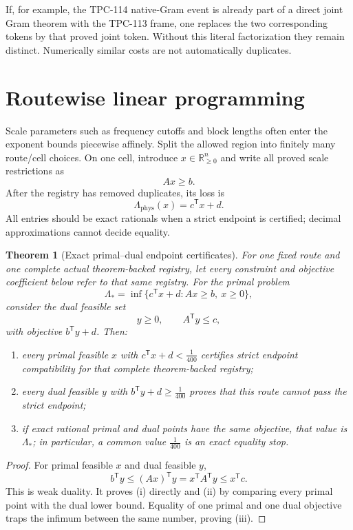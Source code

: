 \documentclass[11pt]{article}
\newtheorem{theorem}{Theorem}[section]
\theoremstyle{definition}
\theoremstyle{remark}
\newcommand{\R}{\mathbb R}
\newcommand{\Lam}{\Lambda_{\mathrm{phys}}}
\newcommand{\epsend}{\frac1{400}}
\begin{document}
If, for example, the TPC-114 native-Gram event is already part of a
direct joint Gram theorem with the TPC-113 frame, one replaces the
two corresponding tokens by that proved joint token.  Without this
literal factorization they remain distinct.  Numerically similar
costs are not automatically duplicates.

\section{Routewise linear programming}

Scale parameters such as frequency cutoffs and block lengths often
enter the exponent bounds piecewise affinely.  Split the allowed
region into finitely many route/cell choices.  On one cell, introduce
\(x\in\R^n_{\ge0}\) and write all proved scale restrictions as
\[
 Ax\ge b.
\]
After the registry has removed duplicates, its loss is
\[
 \Lam(x)=c^\mathsf Tx+d.
\]
All entries should be exact rationals when a strict endpoint is
certified; decimal approximations cannot decide equality.

\begin{theorem}[Exact primal--dual endpoint certificates]
\label{thm:lp}
For one fixed route and one complete actual theorem-backed registry,
let every constraint and objective coefficient below refer to that
same registry.  For the primal problem
\[
 \Lambda_*=\inf\{c^\mathsf Tx+d:Ax\ge b,\ x\ge0\},
\]
consider the dual feasible set
\[
 y\ge0,\qquad A^\mathsf Ty\le c,
\]
with objective \(b^\mathsf Ty+d\).  Then:
\begin{enumerate}[label=(\roman*),leftmargin=2.2em]
\item every primal feasible \(x\) with
  \(c^\mathsf Tx+d<\epsend\) certifies strict endpoint
  compatibility for that complete theorem-backed registry;
\item every dual feasible \(y\) with
  \(b^\mathsf Ty+d\ge\epsend\) proves that this route cannot pass the
  strict endpoint;
\item if exact rational primal and dual points have the same
  objective, that value is \(\Lambda_*\); in particular, a common
  value \(\epsend\) is an exact equality stop.
\end{enumerate}
\end{theorem}

\begin{proof}
For primal feasible \(x\) and dual feasible \(y\),
\[
 b^\mathsf Ty
 \le (Ax)^\mathsf Ty
 =x^\mathsf TA^\mathsf Ty
 \le x^\mathsf Tc.
\]
This is weak duality.  It proves (i) directly and (ii) by comparing
every primal point with the dual lower bound.  Equality of one
primal and one dual objective traps the infimum between the same
number, proving (iii).
\end{proof}
\end{document}
